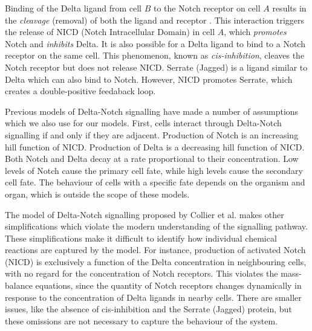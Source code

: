 \documentclass{article}
\begin{document}
\begin{flushleft}

\medskip

Binding of the Delta ligand from cell $B$ to the Notch receptor on cell $A$ results in the \emph{cleavage} (removal) of both the ligand and receptor \cite{bray_notch_2006}.
This interaction triggers the release of NICD (Notch Intracellular Domain) in cell $A$, which \emph{promotes} Notch and \emph{inhibits} Delta.
It is also possible for a Delta ligand to bind to a Notch receptor on the same cell. This phenomenon, known as \emph{cis-inhibition}, cleaves the Notch receptor but does not release NICD.
Serrate (Jagged) is a ligand similar to Delta which can also bind to Notch.
However, NICD promotes Serrate, which creates a double-positive feedaback loop.

\medskip

Previous models of Delta-Notch signalling \cite{collier_pattern_1996, boareto_jaggeddelta_2015} have made a number of assumptions which we also use for our models.
First, cells interact through Delta-Notch signalling if and only if they are adjacent.
Production of Notch is an increasing hill function of NICD.
Production of Delta is a decreasing hill function of NICD.
Both Notch and Delta decay at a rate proportional to their concentration.
Low levels of Notch cause the primary cell fate, while high levels cause the secondary cell fate.
The behaviour of cells with a specific fate depends on the organism and organ, which is outside the scope of these models. 

\medskip

The model of Delta-Notch signalling proposed by Collier et al. \cite{collier_pattern_1996} makes other simplifications which violate the modern understanding of the signalling pathway.
These simplifications make it difficult to identify how individual chemical reactions are captured by the model.
For instance, production of activated Notch (NICD) is exclusively a function of the Delta concentration in neighbouring cells, with no regard for the concentration of Notch receptors.
This violates the mass-balance equations, since the quantity of Notch receptors changes dynamically in response to the concentration of Delta ligands in nearby cells.
There are smaller issues, like the absence of cis-inhibition and the Serrate (Jagged)
protein, but these omissions are not necessary to capture the behaviour of the
system.

\medskip


\end{flushleft}
\end{document}
